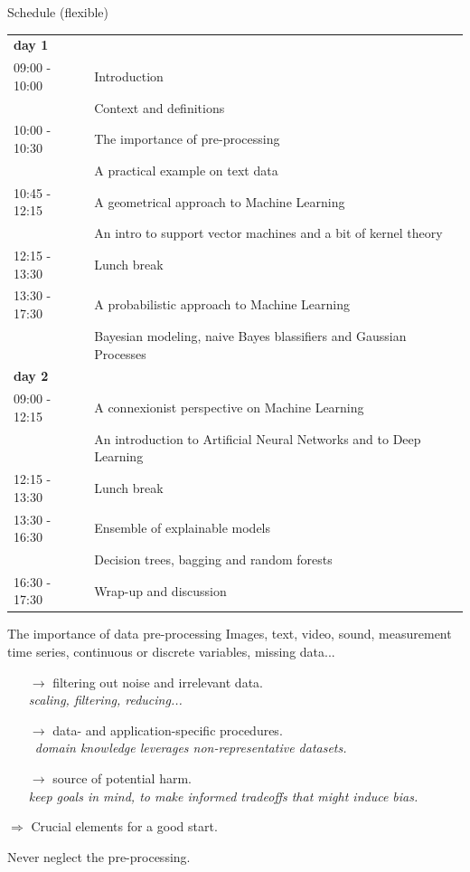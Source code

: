 \documentclass[10pt,a4paper,t,aspectratio=1610,dvipsnames]{beamer}
\begin{document}
\begin{frame}{Schedule (flexible)}
	\begin{tabular}{ll}
		\textbf{day 1} & \\
		09:00 - 10:00 & Introduction\\
		& {\footnotesize Context and definitions}\\
		10:00 - 10:30 & The importance of pre-processing\\
		& {\footnotesize A practical example on text data}\\
		10:45 - 12:15 & A geometrical approach to Machine Learning\\
		& {\footnotesize An intro to support vector machines and a bit of kernel theory}\\
		12:15 - 13:30 & Lunch break\\
		13:30 - 17:30 & A probabilistic approach to Machine Learning\\
		& {\footnotesize Bayesian modeling, naive Bayes blassifiers and Gaussian Processes}\\
		\hline
		\textbf{day 2}&\\
		09:00 - 12:15 & A connexionist perspective on Machine Learning\\
		& {\footnotesize An introduction to Artificial Neural Networks and to Deep Learning}\\
		12:15 - 13:30 & Lunch break\\
		13:30 - 16:30 & Ensemble of explainable models\\
		& {\footnotesize Decision trees, bagging and random forests}\\
		16:30 - 17:30 & Wrap-up and discussion
	\end{tabular}
\end{frame}

\begin{frame}{The importance of data pre-processing}
Images, text, video, sound, measurement time series, continuous or discrete variables, missing data...
\begin{itemize}
	\item[$\rightarrow$] filtering out noise and irrelevant data.\\%
	{\small \it scaling, filtering, reducing...}
	\item[$\rightarrow$] data- and application-specific procedures.\\%
	{\small \it domain knowledge leverages non-representative datasets.}
	\item[$\rightarrow$] source of potential harm.\\%
	{\small \it keep goals in mind, to make informed tradeoffs that might induce bias.}
\end{itemize}
$\Rightarrow$ Crucial elements for a good start.
\begin{center}
	Never neglect the pre-processing.
\end{center}
\end{frame}
\end{document}
